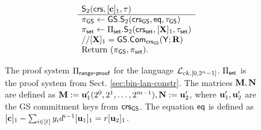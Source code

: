 \begin{figure}
$$\begin{array}{ll}
&
\begin{array}{l}
{\mathsf{S}_2(\mathsf{crs},[\mathbf{c}]_1,\tau)}\\
\hline
\pi_{\mathsf{GS}}\gets {\mathsf{GS}}.\mathsf{S}_2(\mathsf{crs}_{\mathsf{GS}},\mathsf{eq},\tau_{\mathsf{GS}})\\
\pi_{\mathsf{set}}\gets \Pi_{\mathsf{set}}.\mathsf{S}_2(\mathsf{crs}_{\mathsf{set}},[\mathbf{{X}}]_1,\tau_{\mathsf{set}})\\
//{[\mathbf{{X}}]_1={\mathsf{GS}}.\mathsf{Com}_{\mathsf{crs}_{\mathsf{GS}}}({\mathbf{{\mathsf{Y}}}};\mathbf{{R}})}\\
\text{Return }  (\pi_{\mathsf{GS}},\pi_{\mathsf{set}}).
\end{array}
\end{array}$$
\caption{The proof system $\Pi_{\mathsf{range}\mbox{-}\mathsf{proof}}$ for the language $\mathcal{L}_{ck,[0,2^n-1]}$. $\Pi_{\mathsf{set}}$ is the proof system from Sect. \ref{sec:bin-lan-constr}. The matrices $\mathbf{{M}},\mathbf{{N}}$ are defined as $\mathbf{{M}}:=\mathbf{u}'_1(2^0,2^1,\ldots,2^{m-1}),\mathbf{{N}}:=\mathbf{u}'_2$, where $\mathbf{u}'_1,\mathbf{u}'_2$ are the GS commitment keys from $\mathsf{crs}_{\mathsf{GS}}$. The equation $\mathsf{eq}$ is defined as $[\mathbf{c}]_1-\sum_{i\in[\ell]}{y}_id^{i-1}[\mathbf{u}_1]_1=r[\mathbf{u}_2]_1$.
\label{fig:rp}}
\end{figure}

